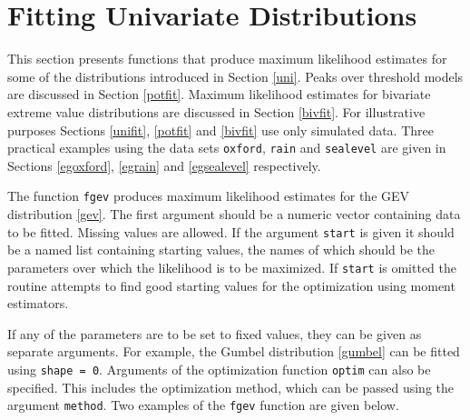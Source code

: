 \documentclass[11pt,a4paper]{article}
\begin{document}
\section{Fitting Univariate Distributions}
\setcounter{footnote}{0}
\label{unifit}

This section presents functions that produce maximum likelihood estimates for some of the distributions introduced in Section \ref{uni}.
Peaks over threshold models are discussed in Section \ref{potfit}.
Maximum likelihood estimates for bivariate extreme value distributions are discussed in Section \ref{bivfit}.
For illustrative purposes Sections \ref{unifit}, \ref{potfit} and \ref{bivfit} use only simulated data.
Three practical examples using the data sets \verb+oxford+,
\verb+rain+ and \verb+sealevel+ are given in Sections \ref{egoxford},
\ref{egrain} and \ref{egsealevel} respectively.

The function \verb+fgev+ produces maximum likelihood estimates for the GEV distribution \eqref{gev}.
The first argument should be a numeric vector containing data to be fitted.
Missing values are allowed.
If the argument \verb+start+ is given it should be a named list containing starting values, the names of which should be the parameters over which the likelihood is to be maximized.
If \verb+start+ is omitted the routine attempts to find good starting values for the optimization using moment estimators.

If any of the parameters are to be set to fixed values, they can be given as separate arguments. 
For example, the Gumbel distribution \eqref{gumbel} can be fitted using \verb+shape = 0+.
Arguments of the optimization function \verb+optim+ can also be specified.
This includes the optimization method, which can be passed using the argument \verb+method+.
Two examples of the \verb+fgev+ function are given below.
\end{document}
